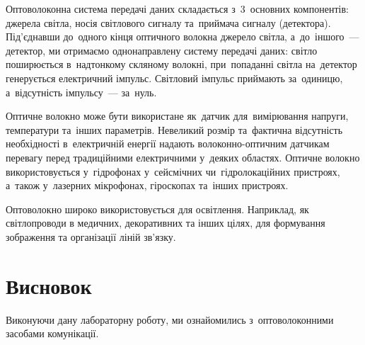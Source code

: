 \documentclass[
	a4paper,
	oneside,
	BCOR = 10mm,
	DIV = 12,
	12pt,
	headings = normal,
]{scrartcl}
\begin{document}
			Оптоволоконна система передачі даних складається з~3~основних компонентів: джерела світла, носія світлового сигналу та~приймача сигналу (детектора). Під'єднавши до~одного кінця оптичного волокна джерело світла, а~до~іншого~— детектор, ми отримаємо однонаправлену систему передачі даних: світло поширюється в~надтонкому скляному волокні, при~попаданні світла на~детектор генерується електричний імпульс. Світловий імпульс приймають за~одиницю, а~відсутність імпульсу~— за~нуль.

			Оптичне волокно може бути використане як~датчик для~вимірювання напруги, температури та~інших параметрів. Невеликий розмір та~фактична відсутність необхідності в~електричній енергії надають волоконно-оптичним датчикам перевагу перед традиційними електричними у~деяких областях. Оптичне волокно використовується у~гідрофонах у~сейсмічних чи~гідролокаційних пристроях, а~також у~лазерних мікрофонах, гіроскопах та~інших пристроях.

			Оптоволокно широко використовується для освітлення. Наприклад, як світлопроводи в медичних, декоративних та інших цілях, для формування зображення та організації ліній зв'язку.

	\section{Висновок}
		Виконуючи дану лабораторну роботу, ми ознайомились з~оптоволоконними засобами комунікації.
\end{document}
